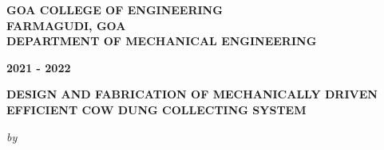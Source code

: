 \begin{center}
%
\bfseries{GOA COLLEGE OF ENGINEERING\\FARMAGUDI, GOA}\\
\bfseries{DEPARTMENT OF MECHANICAL ENGINEERING}\\
\begin{large}
\bfseries{2021 - 2022}\\
\end{large}
\vspace{0.5cm}
\begin{figure}[H]
{\centering {}\par}
\end{figure}
\vspace{-1.3cm}
\vspace{0.5cm}
\begin{large}
{\bfseries DESIGN AND FABRICATION OF MECHANICALLY DRIVEN\\EFFICIENT COW DUNG COLLECTING SYSTEM}\\
\end{large}
\vspace{0.3cm}
\begin{small}
\emph{by}\\

\end{small}
\end{center}
